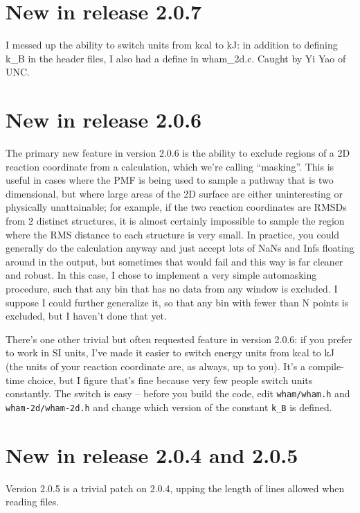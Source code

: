 \documentclass[12pt]{article}
\begin{document}
\section{New in release 2.0.7}

I messed up the ability to switch units from kcal to kJ: in addition to
defining k\_B in the header files, I also had a define in wham\_2d.c.  Caught
by Yi Yao of UNC.

\section{New in release 2.0.6}

The primary new feature in version 2.0.6 is the ability to exclude regions
of a 2D reaction coordinate from a calculation, which we're calling
``masking''.  This is useful in cases where the PMF is being used to sample a
pathway that is two dimensional, but where large areas of the 2D surface are
either uninteresting or physically unattainable; for example, if the two
reaction coordinates are RMSDs from 2 distinct structures, it is almost
certainly impossible to sample the region where the RMS distance to each
structure is very small.  In practice, you could generally do the calculation
anyway and just accept lots of NaNs and Infs floating around in the output,
but sometimes that would fail and this way is far cleaner and robust.  In
this case, I chose to implement a very simple automasking procedure, such
that any bin that has no data from any window is excluded.  I suppose I could
further generalize it, so that any bin with fewer than N points is excluded,
but I haven't done that yet.

There's one other trivial but often requested feature in version 2.0.6: if
you prefer to work in SI units, I've made it easier to switch energy units 
from kcal to kJ (the units of your reaction coordinate are, as always, up to
you).  It's a compile-time choice, but I figure that's fine because very few
people switch units constantly.  The switch is easy -- before you build the
code, edit {\tt wham/wham.h} and {\tt wham-2d/wham-2d.h} and change which
version of the constant {\tt k\_B} is defined.

\section{New in release 2.0.4 and 2.0.5}

Version 2.0.5 is a trivial patch on 2.0.4, upping the length of lines allowed
when reading files.
\end{document}

